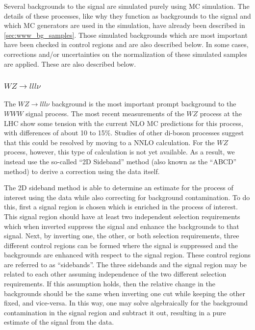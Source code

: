 

Several backgrounds to the signal are simulated purely using MC simulation.
The details of these processes, like why they function as backgrounds
to the signal and which MC generators are used in the simulation,
have already been described in \sec\ref{sec:www_bg_samples}.
Those simulated backgrounds
which are most important have been checked in control regions and are 
also described below.
In some cases, corrections and/or uncertainties on 
the normalization of these simulated samples are applied. 
These are also described below.

%



\subsubsection{$WZ\rightarrow lll\nu$}
\label{sec:wzbg}

The $WZ\rightarrow lll \nu$ background is the most important prompt background 
to the $WWW$ signal process. 
The most recent measurements of the $WZ$ process at the LHC
\cite{Aad:2012twa,Anger:1663539,CMS-PAS-SMP-12-006} 
show some tension with the current NLO MC predictions for this process, 
with differences of about 10 to 15\%. 
Studies of other di-boson processes 
\cite{Grazzini:2015nwa,Cascioli:2014yka}
suggest that this could be resolved by 
moving to a NNLO calculation.
For the $WZ$ process, however, this type of calculation is not yet available.
As a result, we instead use the so-called ``2D Sideband'' method (also known as the 
``ABCD'' method) \cite{Aad:2013izg} to derive a correction using the data itself.


The 2D sideband method is able to determine an estimate
for the process of interest using the data while also correcting
for background contamination. 
To do this, first a signal region 
is chosen which is enriched in the process of interest.
This signal region should have at least two 
independent selection requirements which when inverted suppress
the signal and enhance the backgrounds to that signal.
Next, by inverting one, the other, or both selection requirements, 
three different control regions can be formed
where the signal is suppressed and the backgrounds are enhanced 
with respect to the signal region. 
These control regions are referred to as ``sidebands''.
The three sidebands and the signal region may be
related to each other assuming independence of the two different selection
requirements. If this assumption holds, then the relative change in the 
backgrounds should be the same
when inverting one cut while keeping the other fixed, and vice-versa.
In this way, one may solve algebraically for the background contamination 
in the signal region and subtract it out, resulting in a pure
estimate of the signal from the data. 


